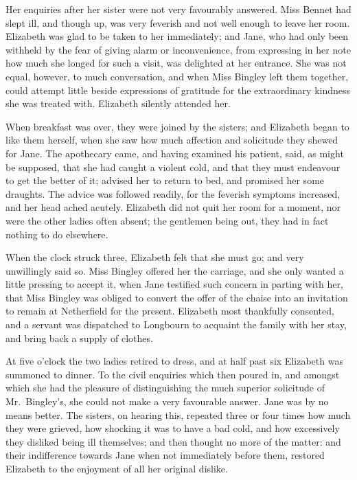 Her enquiries after her sister were not very favourably
answered. Miss Bennet had slept ill, and though up,
was very feverish and not well enough to leave her room.
Elizabeth was glad to be taken to her immediately; and
Jane, who had only been withheld by the fear of giving
alarm or inconvenience, from expressing in her note how
much she longed for such a visit, was delighted at her
entrance. She was not equal, however, to much conversation,
and when Miss Bingley left them together,
could attempt little beside expressions of gratitude for
the extraordinary kindness she was treated with. Elizabeth
silently attended her.

When breakfast was over, they were joined by the
sisters; and Elizabeth began to like them herself, when
she saw how much affection and solicitude they shewed
for Jane. The apothecary came, and having examined
his patient, said, as might be supposed, that she had
caught a violent cold, and that they must endeavour to
get the better of it; advised her to return to bed, and
promised her some draughts. The advice was followed
readily, for the feverish symptoms increased, and her
head ached acutely. Elizabeth did not quit her room
for a moment, nor were the other ladies often absent;
the gentlemen being out, they had in fact nothing to do
elsewhere.

When the clock struck three, Elizabeth felt that she
must go; and very unwillingly said so. Miss Bingley
offered her the carriage, and she only wanted a little
pressing to accept it, when Jane testified such concern
in parting with her, that Miss Bingley was obliged to
convert the offer of the chaise into an invitation to remain
at Netherfield for the present. Elizabeth most thankfully
consented, and a servant was dispatched to Longbourn
to acquaint the family with her stay, and bring back
a supply of clothes.


At five o’clock the two ladies retired to dress, and
at half past six Elizabeth was summoned to dinner. To
the civil enquiries which then poured in, and amongst
which she had the pleasure of distinguishing the much
superior solicitude of Mr.\ Bingley’s, she could not make
a very favourable answer. Jane was by no means better.
The sisters, on hearing this, repeated three or four times
how much they were grieved, how shocking it was to have
a bad cold, and how excessively they disliked being ill
themselves; and then thought no more of the matter:
and their indifference towards Jane when not immediately
before them, restored Elizabeth to the enjoyment of all
her original dislike.

